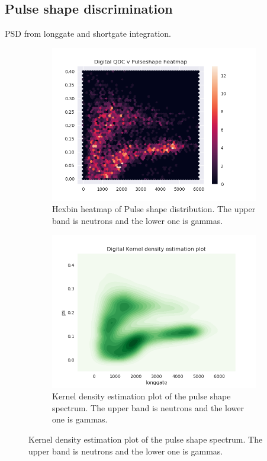 \documentclass[main.tex]{subfiles}
\begin{document}
\subsection{Pulse shape discrimination}
PSD from longgate and shortgate integration.
\begin{figure}
    \centering
    \begin{subfigure}[b]{0.49\textwidth}
        \includegraphics[width=\textwidth]{DigitalResults/psd_hexbin.png}
        \caption{Hexbin heatmap of Pulse shape distribution. The upper band is neutrons and the lower one is gammas.}
        \label{fig:hex_a}
    \end{subfigure}
    \begin{subfigure}[b]{0.49\textwidth}
        \includegraphics[width=\textwidth]{DigitalResults/psd_kde.png}
        \caption{Kernel density estimation plot of the pulse shape spectrum. The upper band is neutrons and the lower one is gammas.}
        \label{fig:kde_a}
    \end{subfigure}
\label{fig:animals}
\end{figure}
\end{document}
